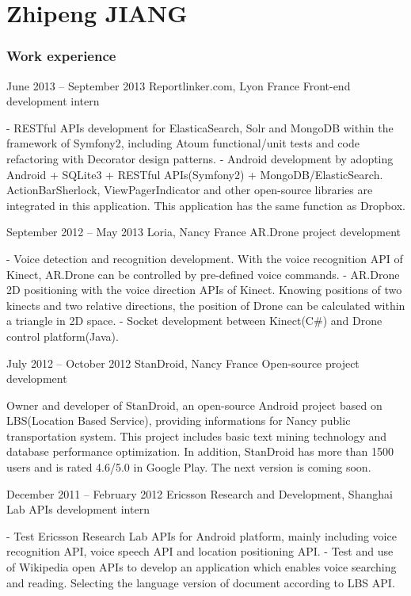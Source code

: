 \documentclass{tccv}
\begin{document}
\part{Zhipeng JIANG}

\section{Work experience}

\begin{eventlist}

\item{June 2013 -- September 2013}
     {Reportlinker.com, Lyon France}
     {Front-end development intern}

- RESTful APIs development for ElasticaSearch, Solr and MongoDB within the framework of Symfony2, including Atoum functional/unit tests and code refactoring with Decorator design patterns.
\newline
- Android development by adopting Android + SQLite3 + RESTful APIs(Symfony2) + MongoDB/ElasticSearch. ActionBarSherlock, ViewPagerIndicator and other open-source libraries are integrated in this application. This application has the same function as Dropbox.

\item{September 2012 -- May 2013}
     {Loria, Nancy France}
     {AR.Drone project development}

- Voice detection and recognition development. With the voice recognition API of Kinect, AR.Drone can be controlled by pre-defined voice commands.
\newline
- AR.Drone 2D positioning with the voice direction APIs of Kinect. Knowing positions of two kinects and two relative directions, the position of Drone can be calculated within a triangle in 2D space.
\newline
- Socket development between Kinect(C\#) and Drone control platform(Java).

\item{July 2012 -- October 2012}
     {StanDroid, Nancy France}
     {Open-source project development}

Owner and developer of StanDroid, an open-source Android project based on LBS(Location Based Service), providing informations for Nancy public transportation system. This project includes basic text mining technology and database performance optimization. In addition, StanDroid has more than 1500 users and is rated 4.6/5.0 in Google Play. The next version is coming soon.

\item{December 2011 -- February 2012}
     {Ericsson Research and Development, Shanghai}
     {Lab APIs development intern}

- Test Ericsson Research Lab APIs for Android platform, mainly including voice recognition API, voice speech API and location positioning API.
\newline
- Test and use of Wikipedia open APIs to develop an application which enables voice searching and reading. Selecting the language version of document according to LBS API.

\end{eventlist}
\end{document}

